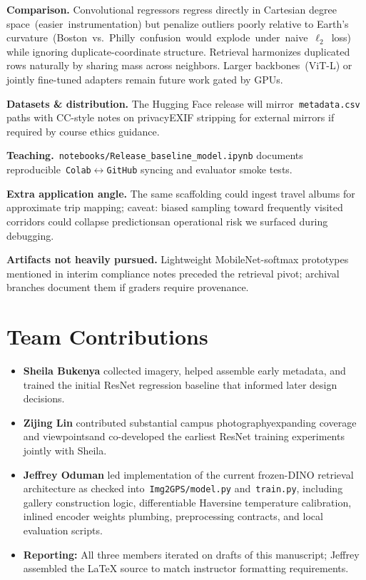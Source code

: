 \documentclass[10pt]{article}
\begin{document}
\textbf{Comparison.} Convolutional regressors regress directly in Cartesian degree space~\mbox{(easier instrumentation)} but penalize outliers poorly relative to Earth's curvature~\mbox{(Boston vs.\ Philly confusion would explode under naive $\ell_2$ loss)} while ignoring duplicate-coordinate structure. Retrieval harmonizes duplicated rows naturally by sharing mass across neighbors. Larger backbones~\mbox{(ViT-L)} or jointly fine-tuned adapters remain future work gated by GPUs.

\textbf{Datasets \& distribution.} The Hugging Face release will mirror~\texttt{metadata.csv} paths with CC-style notes on privacy\textemdash EXIF stripping for external mirrors if required by course ethics guidance.

\textbf{Teaching.}~\texttt{notebooks/Release\_baseline\_model.ipynb} documents reproducible~\texttt{Colab}$\leftrightarrow$\texttt{GitHub} syncing and evaluator smoke tests.

\textbf{Extra application angle.} The same scaffolding could ingest travel albums for approximate trip mapping; caveat: biased sampling toward frequently visited corridors could collapse predictions\textemdash an operational risk we surfaced during debugging.

\textbf{Artifacts not heavily pursued.} Lightweight MobileNet-softmax prototypes mentioned in interim compliance notes preceded the retrieval pivot; archival branches document them if graders require provenance.



\section{Team Contributions}

\begin{itemize}
\item \textbf{Sheila Bukenya} collected imagery, helped assemble early metadata, and trained the initial ResNet regression baseline that informed later design decisions.

\item \textbf{Zijing Lin} contributed substantial campus photography\textemdash expanding coverage and viewpoints\textemdash and co-developed the earliest ResNet training experiments jointly with Sheila.

\item \textbf{Jeffrey Oduman} led implementation of the current frozen-DINO retrieval architecture as checked into~\texttt{Img2GPS/model.py} and~\texttt{train.py}, including gallery construction logic, differentiable Haversine temperature calibration, inlined encoder weights plumbing, preprocessing contracts, and local evaluation scripts.

\item \textbf{Reporting:} All three members iterated on drafts of this manuscript; Jeffrey assembled the \LaTeX{} source to match instructor formatting requirements.
\end{itemize}
\end{document}
